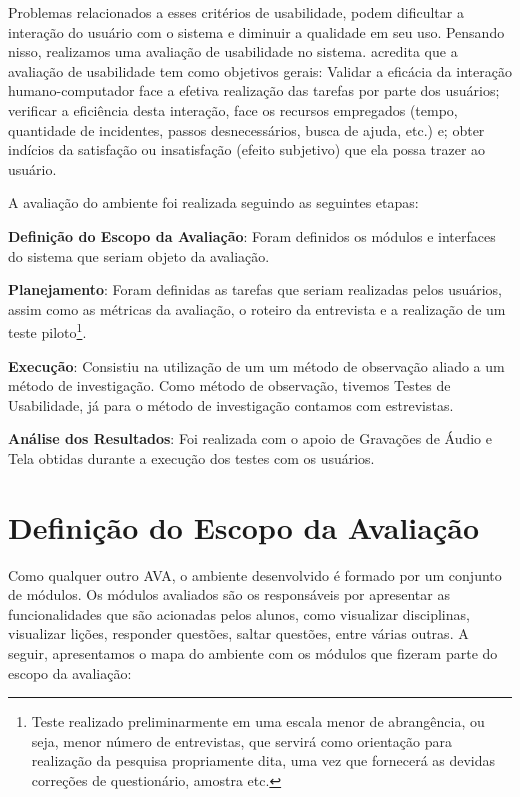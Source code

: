 Problemas relacionados a esses crit\'erios de usabilidade, podem dificultar a intera\c{c}\~ao do usu\'ario com o sistema e diminuir a 
qualidade em seu uso. Pensando nisso, realizamos uma avalia\c{c}\~ao de usabilidade no sistema.  acredita que a avalia\c{c}\~ao de usabilidade tem como objetivos gerais: Validar a eficácia da interação humano-computador face a efetiva realização das tarefas por parte dos usuários; verificar a eficiência desta interação, face os recursos empregados (tempo, quantidade de incidentes, passos desnecessários, 
busca de ajuda, etc.) e; obter indícios da satisfação ou insatisfação (efeito subjetivo) que ela possa trazer ao usuário.

A avaliação do ambiente foi realizada seguindo as seguintes etapas:

\begin{alineascomnumero}
	\item \textbf{Definição do Escopo da Avaliação}: Foram definidos os módulos e interfaces do sistema que seriam objeto da avaliação.
	\item \textbf{Planejamento}: Foram definidas as tarefas que seriam realizadas pelos usuários, assim como as métricas da avaliação, o roteiro da entrevista e a realização de um teste piloto\footnote{Teste realizado preliminarmente em uma escala menor de abrangência, ou seja, menor número de entrevistas, que servirá como orientação para realização da pesquisa propriamente dita, uma vez que fornecerá as devidas correções de questionário, amostra etc.}. 
	\item \textbf{Execução}: Consistiu na utilização de um um método de observação aliado a um método de investigação. Como método de observação, tivemos Testes de Usabilidade, já para o método de investigação contamos com estrevistas.
	\item \textbf{An\'alise dos Resultados}: Foi realizada com o apoio de Gravações de Áudio e Tela obtidas durante a execução dos testes com os usuários.
\end{alineascomnumero}

\section{Definição do Escopo da Avalia\c{c}\~ao}
Como qualquer outro AVA, o ambiente desenvolvido é formado por um conjunto de módulos. Os módulos avaliados são os responsáveis por apresentar as funcionalidades que são acionadas pelos alunos, como visualizar disciplinas, visualizar lições, responder questões, saltar questões, entre várias outras. A seguir, apresentamos o mapa do ambiente com os módulos que fizeram parte do escopo da avaliação:

